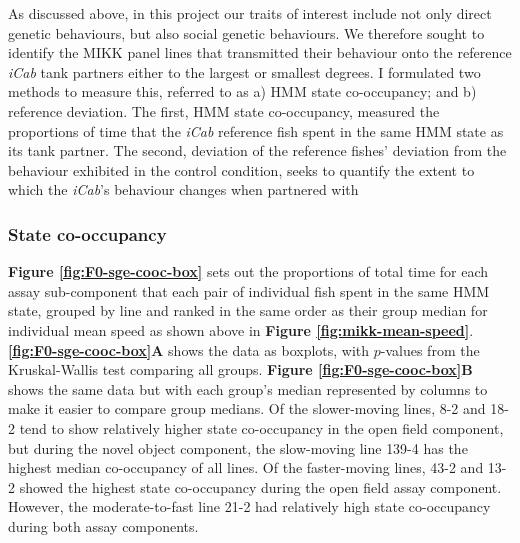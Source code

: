 \documentclass[
]{article}
\begin{document}
As discussed above, in this project our traits of interest include not only direct genetic behaviours, but also social genetic behaviours. We therefore sought to identify the MIKK panel lines that transmitted their behaviour onto the reference \emph{\textcolor{iCab_424B4D}{iCab}} tank partners either to the largest or smallest degrees. I formulated two methods to measure this, referred to as a) HMM state co-occupancy; and b) reference deviation. The first, HMM state co-occupancy, measured the proportions of time that the \emph{\textcolor{iCab_424B4D}{iCab}} reference fish spent in the same HMM state as its tank partner. The second, deviation of the reference fishes' deviation from the behaviour exhibited in the control condition, seeks to quantify the extent to which the \emph{\textcolor{iCab_424B4D}{iCab}}'s behaviour changes when partnered with

\hypertarget{state-co-occupancy}{%
\subsubsection{State co-occupancy}\label{state-co-occupancy}}

\textbf{Figure \ref{fig:F0-sge-cooc-box}} sets out the proportions of total time for each assay sub-component that each pair of individual fish spent in the same HMM state, grouped by line and ranked in the same order as their group median for individual mean speed as shown above in \textbf{Figure \ref{fig:mikk-mean-speed}}. \textbf{\ref{fig:F0-sge-cooc-box}A} shows the data as boxplots, with \(p\)-values from the Kruskal-Wallis test comparing all groups. \textbf{Figure \ref{fig:F0-sge-cooc-box}B} shows the same data but with each group's median represented by columns to make it easier to compare group medians. Of the slower-moving lines, \textcolor{8-2_FF699C}{8-2} and \textcolor{18-2_FF66A6}{18-2} tend to show relatively higher state co-occupancy in the open field component, but during the novel object component, the slow-moving line \textcolor{139-4_FF61CC}{139-4} has the highest median co-occupancy of all lines. Of the faster-moving lines, \textcolor{43-2_F17D50}{43-2} and \textcolor{13-2_F57A5F}{13-2} showed the highest state co-occupancy during the open field assay component. However, the moderate-to-fast line \textcolor{21-2_49B500}{21-2} had relatively high state co-occupancy during both assay components.
\end{document}
